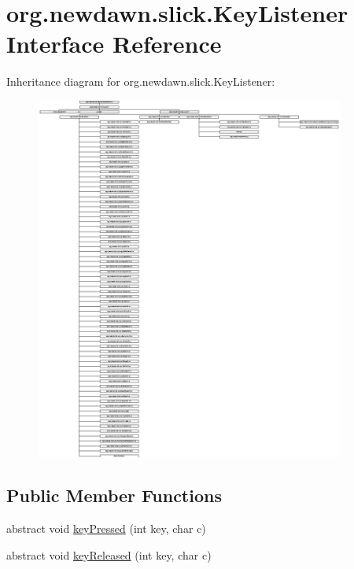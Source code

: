 \hypertarget{interfaceorg_1_1newdawn_1_1slick_1_1_key_listener}{}\section{org.\+newdawn.\+slick.\+Key\+Listener Interface Reference}
\label{interfaceorg_1_1newdawn_1_1slick_1_1_key_listener}
Inheritance diagram for org.\+newdawn.\+slick.\+Key\+Listener\+:\begin{figure}[H]
\begin{center}
\leavevmode
\includegraphics[height=12.000000cm]{interfaceorg_1_1newdawn_1_1slick_1_1_key_listener}
\end{center}
\end{figure}
\subsection*{Public Member Functions}
\begin{DoxyCompactItemize}
\item 
abstract void \mbox{\hyperlink{interfaceorg_1_1newdawn_1_1slick_1_1_key_listener_ac0b0568a21ef486c4f51382614c196ef}{key\+Pressed}} (int key, char c)
\item 
abstract void \mbox{\hyperlink{interfaceorg_1_1newdawn_1_1slick_1_1_key_listener_a474673b59bc77266bcef3c261c26ee2b}{key\+Released}} (int key, char c)
\end{DoxyCompactItemize}


